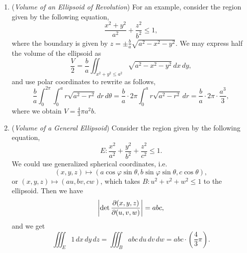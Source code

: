 \begin{enumerate}[label=(\alph*)]
    \item (\textit{Volume of an Ellipsoid of Revolution}) For an example, consider the region given by the following equation,
    \[ \frac{x^2 + y^2}{a^2} + \frac{z^2}{b^2} \leq 1, \]
    where the boundary is given by $z = \pm \frac{b}{a} \sqrt{a^2 - x^2 - y^2}$. We may express half the volume of the ellipsoid as
    \[ \frac{V}{2} = \frac{b}{a} \iint_{x^2 + y^2 \leq a^2} \sqrt{a^2 - x^2 - y^2} \, dx \, dy, \]
    and use polar coordinates to rewrite as follows,
    \[ \frac{b}{a} \int_0^{2\pi} \int_0^a r \sqrt{a^2 - r^2} \, dr \, d\theta = \frac{b}{a} \cdot 2\pi \int_0^a r \sqrt{a^2 - r^2} \, dr = \frac{b}{a} \cdot 2\pi \cdot \frac{a^3}{3}, \]
    where we obtain $V = \frac{4}{3} \pi a^2 b$.
    \item (\textit{Volume of a General Ellipsoid}) Consider the region given by the following equation,
    \[ E : \frac{x^2}{a^2} + \frac{y^2}{b^2} + \frac{z^2}{c^2} \leq 1. \]
    We could use generalized spherical coordinates, i.e.
    \[ (x, y, z) \mapsto (a \cos \varphi \sin \theta, b \sin \varphi \sin \theta, c \cos \theta), \]
    or $(x, y, z) \mapsto (au, bv, cw)$, which takes $B : u^2 + v^2 + w^2 \leq 1$ to the ellipsoid. Then we have
    \[ \left\lvert \det \frac{\partial(x, y, z)}{\partial(u, v, w)} \right\rvert = abc, \]
    and we get
    \[ \iiint_{E} 1 \, dx \, dy \, dz = \iiint_{B} abc \, du \, dv \, dw = abc \cdot \left(\frac{4}{3} \pi\right). \]
\end{enumerate}